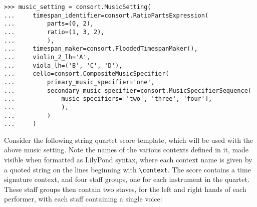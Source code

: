 \begin{abjadbookoutput}
\begin{singlespacing}
\vspace{-0.5\baselineskip}
\begin{verbatim}
>>> music_setting = consort.MusicSetting(
...     timespan_identifier=consort.RatioPartsExpression(
...         parts=(0, 2),
...         ratio=(1, 3, 2),
...         ),
...     timespan_maker=consort.FloodedTimespanMaker(),
...     violin_2_lh='A',
...     viola_lh=('B', 'C', 'D'),
...     cello=consort.CompositeMusicSpecifier(
...         primary_music_specifier='one',
...         secondary_music_specifier=consort.MusicSpecifierSequence(
...             music_specifiers=['two', 'three', 'four'],
...             ),
...         )
...     )
\end{verbatim}
\end{singlespacing}
\end{abjadbookoutput}

\noindent Consider the following string quartet score template, which will be
used with the above music setting. Note the names of the various contexts
defined in it, made visible when formatted as LilyPond syntax, where each
context name is given by a quoted string on the lines beginning with
\texttt{\textbackslash{}context}. The score contains a time signature context,
and four staff groups, one for each instrument in the quartet. These staff
groups then contain two staves, for the left and right hands of each
performer, with each staff containing a single voice:

\begin{comment}
<abjad>
score_template = consort.StringQuartetScoreTemplate()
score = score_template()
print(format(score))
</abjad>
\end{comment}

